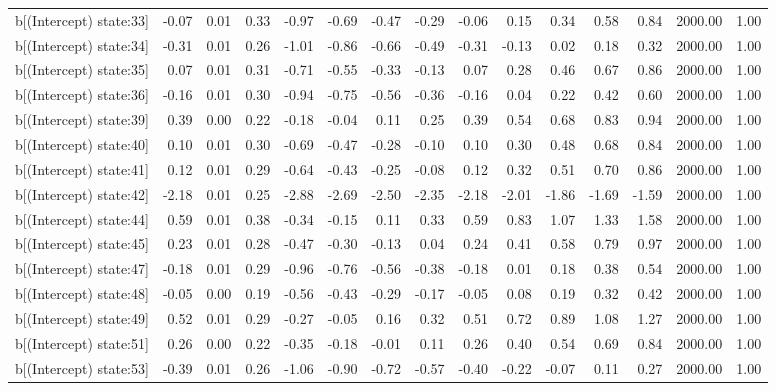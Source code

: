 \begin{table}[ht]
\begin{tabular}{rrrrrrrrrrrrrrr}
  b[(Intercept) state:33] & -0.07 & 0.01 & 0.33 & -0.97 & -0.69 & -0.47 & -0.29 & -0.06 & 0.15 & 0.34 & 0.58 & 0.84 & 2000.00 & 1.00 \\ 
  b[(Intercept) state:34] & -0.31 & 0.01 & 0.26 & -1.01 & -0.86 & -0.66 & -0.49 & -0.31 & -0.13 & 0.02 & 0.18 & 0.32 & 2000.00 & 1.00 \\ 
  b[(Intercept) state:35] & 0.07 & 0.01 & 0.31 & -0.71 & -0.55 & -0.33 & -0.13 & 0.07 & 0.28 & 0.46 & 0.67 & 0.86 & 2000.00 & 1.00 \\ 
  b[(Intercept) state:36] & -0.16 & 0.01 & 0.30 & -0.94 & -0.75 & -0.56 & -0.36 & -0.16 & 0.04 & 0.22 & 0.42 & 0.60 & 2000.00 & 1.00 \\ 
  b[(Intercept) state:39] & 0.39 & 0.00 & 0.22 & -0.18 & -0.04 & 0.11 & 0.25 & 0.39 & 0.54 & 0.68 & 0.83 & 0.94 & 2000.00 & 1.00 \\ 
  b[(Intercept) state:40] & 0.10 & 0.01 & 0.30 & -0.69 & -0.47 & -0.28 & -0.10 & 0.10 & 0.30 & 0.48 & 0.68 & 0.84 & 2000.00 & 1.00 \\ 
  b[(Intercept) state:41] & 0.12 & 0.01 & 0.29 & -0.64 & -0.43 & -0.25 & -0.08 & 0.12 & 0.32 & 0.51 & 0.70 & 0.86 & 2000.00 & 1.00 \\ 
  b[(Intercept) state:42] & -2.18 & 0.01 & 0.25 & -2.88 & -2.69 & -2.50 & -2.35 & -2.18 & -2.01 & -1.86 & -1.69 & -1.59 & 2000.00 & 1.00 \\ 
  b[(Intercept) state:44] & 0.59 & 0.01 & 0.38 & -0.34 & -0.15 & 0.11 & 0.33 & 0.59 & 0.83 & 1.07 & 1.33 & 1.58 & 2000.00 & 1.00 \\ 
  b[(Intercept) state:45] & 0.23 & 0.01 & 0.28 & -0.47 & -0.30 & -0.13 & 0.04 & 0.24 & 0.41 & 0.58 & 0.79 & 0.97 & 2000.00 & 1.00 \\ 
  b[(Intercept) state:47] & -0.18 & 0.01 & 0.29 & -0.96 & -0.76 & -0.56 & -0.38 & -0.18 & 0.01 & 0.18 & 0.38 & 0.54 & 2000.00 & 1.00 \\ 
  b[(Intercept) state:48] & -0.05 & 0.00 & 0.19 & -0.56 & -0.43 & -0.29 & -0.17 & -0.05 & 0.08 & 0.19 & 0.32 & 0.42 & 2000.00 & 1.00 \\ 
  b[(Intercept) state:49] & 0.52 & 0.01 & 0.29 & -0.27 & -0.05 & 0.16 & 0.32 & 0.51 & 0.72 & 0.89 & 1.08 & 1.27 & 2000.00 & 1.00 \\ 
  b[(Intercept) state:51] & 0.26 & 0.00 & 0.22 & -0.35 & -0.18 & -0.01 & 0.11 & 0.26 & 0.40 & 0.54 & 0.69 & 0.84 & 2000.00 & 1.00 \\ 
  b[(Intercept) state:53] & -0.39 & 0.01 & 0.26 & -1.06 & -0.90 & -0.72 & -0.57 & -0.40 & -0.22 & -0.07 & 0.11 & 0.27 & 2000.00 & 1.00 \\ 

\end{tabular}
\end{table}
